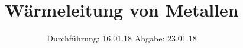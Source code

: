 

\subject{V204}
\title{Wärmeleitung von Metallen}
\date{%
  Durchführung: 16.01.18
  \hspace{3em}
  Abgabe: 23.01.18
}



\maketitle
\thispagestyle{empty}
\tableofcontents
\newpage






\printbibliography{}


